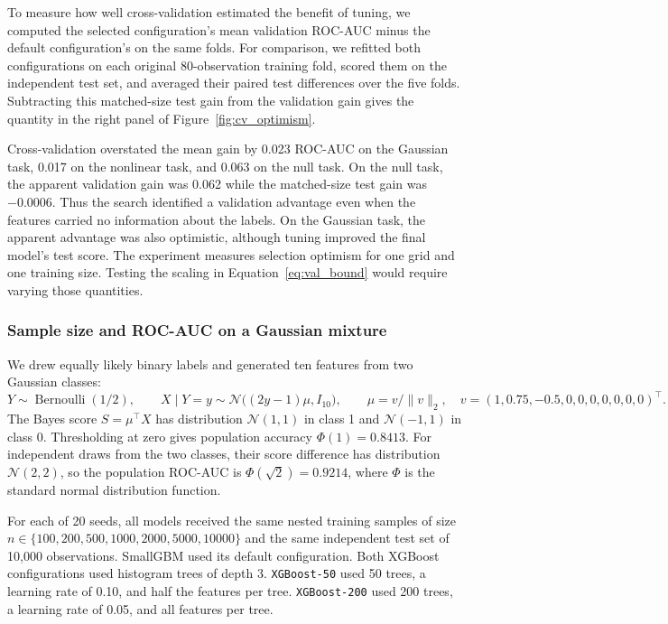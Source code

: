 \documentclass{article}
\begin{document}
To measure how well cross-validation estimated the benefit of tuning, we computed the selected configuration's mean validation ROC-AUC minus the default configuration's on the same folds. For comparison, we refitted both configurations on each original 80-observation training fold, scored them on the independent test set, and averaged their paired test differences over the five folds. Subtracting this matched-size test gain from the validation gain gives the quantity in the right panel of Figure~\ref{fig:cv_optimism}.

Cross-validation overstated the mean gain by 0.023 ROC-AUC on the Gaussian task, 0.017 on the nonlinear task, and 0.063 on the null task. On the null task, the apparent validation gain was 0.062 while the matched-size test gain was \(-0.0006\). Thus the search identified a validation advantage even when the features carried no information about the labels. On the Gaussian task, the apparent advantage was also optimistic, although tuning improved the final model's test score. The experiment measures selection optimism for one grid and one training size. Testing the scaling in Equation~\eqref{eq:val_bound} would require varying those quantities.

\subsubsection{Sample size and ROC-AUC on a Gaussian mixture}
\label{sec:n_crossover}

We drew equally likely binary labels and generated ten features from two Gaussian classes:
\[
Y\sim\operatorname{Bernoulli}(1/2),\qquad
X\mid Y=y\sim\mathcal{N}\bigl((2y-1)\mu,I_{10}\bigr),\qquad
\mu=v/\|v\|_2,\quad v=(1,0.75,-0.5,0,0,0,0,0,0,0)^\top .
\]
The Bayes score $S=\mu^\top X$ has distribution $\mathcal{N}(1,1)$ in class 1 and $\mathcal{N}(-1,1)$ in class 0. Thresholding at zero gives population accuracy $\Phi(1)=0.8413$. For independent draws from the two classes, their score difference has distribution $\mathcal{N}(2,2)$, so the population ROC-AUC is $\Phi(\sqrt{2})=0.9214$, where $\Phi$ is the standard normal distribution function.

For each of 20 seeds, all models received the same nested training samples of size $n\in\{100,200,500,1000,2000,5000,10000\}$ and the same independent test set of 10,000 observations. SmallGBM used its default configuration. Both XGBoost configurations used histogram trees of depth 3. \texttt{XGBoost-50} used 50 trees, a learning rate of 0.10, and half the features per tree. \texttt{XGBoost-200} used 200 trees, a learning rate of 0.05, and all features per tree.
\end{document}

